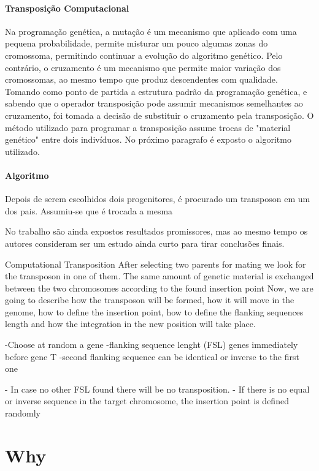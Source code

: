 \documentclass[12pt,portuguese,a4paper]{article}
\begin{document}
\paragraph{Transposição Computacional}

Na programação genética, a mutação é um mecanismo que aplicado com uma pequena probabilidade, permite misturar um pouco algumas zonas do cromossoma, permitindo continuar a evolução do algoritmo genético. Pelo contrário, o cruzamento é um mecanismo que permite maior variação dos cromossomas, ao mesmo tempo que produz descendentes com qualidade.  Tomando como ponto de partida a estrutura padrão da programação genética, e sabendo que o operador transposição pode assumir mecanismos semelhantes ao cruzamento, foi tomada a decisão de substituir o cruzamento pela transposição. O método utilizado para programar a transposição assume trocas de "material genético" entre dois indivíduos. No próximo paragrafo é exposto o algoritmo utilizado.

\paragraph{Algoritmo}

Depois de serem escolhidos dois progenitores, é procurado um transposon em um dos pais.
Assumiu-se que é trocada a mesma

No trabalho \cite{Simoes99transposition:a} são ainda expostos resultados promissores, mas ao mesmo tempo os autores consideram ser um estudo ainda curto para tirar conclusões finais.



Computational Transposition
After selecting two parents for mating we look for the transposon in one of them.
The same amount of genetic material is exchanged between the two chromosomes according to the found insertion point
Now, we are going to describe how the transposon will be formed, how it will move in the genome, how to define the insertion point, how to define the flanking sequences length and how the integration in the new position will take place.

-Choose at random a gene
-flanking sequence lenght (FSL) genes immediately before gene T
-second flanking sequence can be identical or inverse to the first one

- In case no other FSL found there will be no transposition.
- If there is no equal or inverse sequence in the target chromosome, the insertion point is defined randomly


\section{Why}
\end{document}
